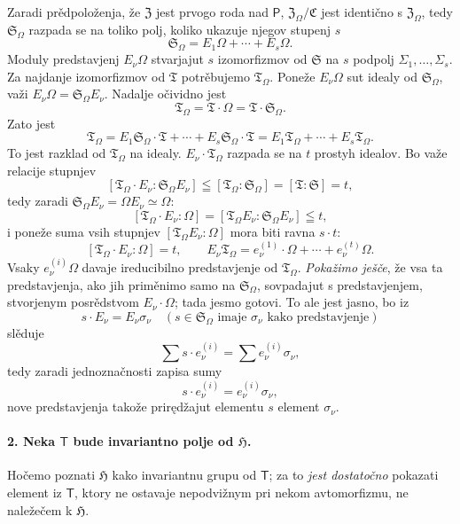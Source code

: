 \documentclass[11pt]{article}
\begin{document}
Zaradi prědpoloženja, že \(\mathfrak Z\) jest prvogo roda nad \(\mathsf P\), \(\mathfrak Z_\Omega/\mathfrak C\) jest identično s \(\mathfrak Z_\Omega\), tedy \(\mathfrak S_\Omega\) razpada se na toliko polj, koliko ukazuje njegov stupenj \(s\)
\[
\mathfrak S_\Omega = E_1\Omega+\cdots+E_s\Omega .
\]
Moduly predstavjenj \(E_\nu\Omega\) stvarjajut \(s\) izomorfizmov od \(\mathfrak S\) na \(s\) podpolj \(\Sigma_1,\ldots,\Sigma_s\). Za najdanje izomorfizmov od \(\mathfrak T\) potrěbujemo \(\mathfrak T_\Omega\). Poneže \(E_\nu\Omega\) sut idealy od \(\mathfrak S_\Omega\), važi \(E_\nu\Omega=\mathfrak S_\Omega E_\nu\). Nadalje očividno jest
\[
\mathfrak T_\Omega=\mathfrak T\cdot\Omega=\mathfrak T\cdot\mathfrak S_\Omega .
\]
Zato jest
\[
\mathfrak T_\Omega
=E_1\mathfrak S_\Omega\cdot\mathfrak T+\cdots+E_s\mathfrak S_\Omega\cdot\mathfrak T
=E_1\mathfrak T_\Omega+\cdots+E_s\mathfrak T_\Omega .
\]
To jest razklad od \(\mathfrak T_\Omega\) na idealy. \(E_\nu\cdot\mathfrak T_\Omega\) razpada se na \(t\) prostyh idealov. Bo važe relacije stupnjev
\[
[\mathfrak T_\Omega\cdot E_\nu:\mathfrak S_\Omega E_\nu]
\leqq [\mathfrak T_\Omega:\mathfrak S_\Omega]=[\mathfrak T:\mathfrak S]=t,
\]
tedy zaradi \(\mathfrak S_\Omega E_\nu=\Omega E_\nu\simeq\Omega\):
\[
[\mathfrak T_\Omega\cdot E_\nu:\Omega]
=[\mathfrak T_\Omega E_\nu:\mathfrak S_\Omega E_\nu]\leqq t,
\]
i poneže suma vsih stupnjev \([\mathfrak T_\Omega E_\nu:\Omega]\) mora biti ravna \(s\cdot t\):
\[
[\mathfrak T_\Omega\cdot E_\nu:\Omega]=t,\qquad
E_\nu\mathfrak T_\Omega=e_\nu^{(1)}\cdot\Omega+\cdots+e_\nu^{(t)}\Omega .
\]
Vsaky \(e_\nu^{(i)}\Omega\) davaje ireducibilno predstavjenje od \(\mathfrak T_\Omega\). \emph{Pokažimo ješče}, že vsa ta predstavjenja, ako jih priměnimo samo na \(\mathfrak S_\Omega\), sovpadajut s predstavjenjem, stvorjenym posrědstvom \(E_\nu\cdot\Omega\); tada jesmo gotovi. To ale jest jasno, bo iz
\[
s\cdot E_\nu=E_\nu\sigma_\nu\quad
(s\in\mathfrak S_\Omega\text{ imaje }\sigma_\nu\text{ kako predstavjenje})
\]
slěduje
\[
\sum s\cdot e_\nu^{(i)}=\sum e_\nu^{(i)}\sigma_\nu,
\]
tedy zaradi jednoznačnosti zapisa sumy
\[
s\cdot e_\nu^{(i)}=e_\nu^{(i)}\sigma_\nu,
\]
nove predstavjenja takože prirędžajut elementu \(s\) element \(\sigma_\nu\).

\paragraph{2. Neka \(\mathsf T\) bude invariantno polje od \(\mathfrak H\).}
Hočemo poznati \(\mathfrak H\) kako invariantnu grupu od \(\mathsf T\); za to \emph{jest dostatočno} pokazati element iz \(\mathsf T\), ktory ne ostavaje nepodvižnym pri nekom avtomorfizmu, ne naležečem k \(\mathfrak H\).
\end{document}
